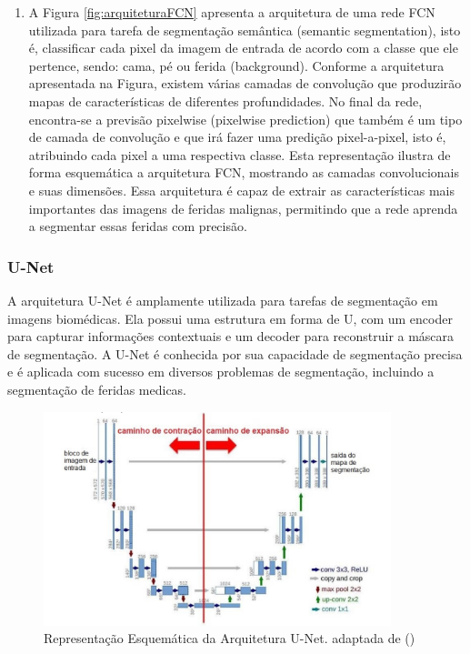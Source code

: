         \begin{enumerate}
            \item A Figura \ref{fig:arquiteturaFCN} apresenta a arquitetura de uma rede \ac{FCN} utilizada para tarefa de segmentação semântica (semantic segmentation), isto é, classificar cada pixel da imagem de entrada de acordo com a classe que ele pertence, sendo: cama, pé ou ferida (background). Conforme a arquitetura apresentada na Figura, existem várias camadas de convolução que produzirão mapas de características de diferentes profundidades. No final da rede, encontra-se a previsão pixelwise (pixelwise prediction) que também é um tipo de camada de convolução e que irá fazer uma predição pixel-a-pixel, isto é, atribuindo cada pixel a uma respectiva classe. Esta representação ilustra de forma esquemática a arquitetura \ac{FCN}, mostrando as camadas convolucionais e suas dimensões. Essa arquitetura é capaz de extrair as características mais importantes das imagens de feridas malignas, permitindo que a rede aprenda a segmentar essas feridas com precisão. 
        \end{enumerate}

    
    \subsubsection{U-Net}

        A arquitetura \ac{U-Net} é amplamente utilizada para tarefas de segmentação em imagens biomédicas. Ela possui uma estrutura em forma de U, com um encoder para capturar informações contextuais e um decoder para reconstruir a máscara de segmentação. A \ac{U-Net} é conhecida por sua capacidade de segmentação precisa e é aplicada com sucesso em diversos problemas de segmentação, incluindo a segmentação de feridas medicas.

        \begin{figure}[H]
            \centering
            \includegraphics[width=0.9\textwidth]{img/arquitetura_U-Net.png}
            \caption{Representação Esquemática da Arquitetura \ac{U-Net}. adaptada de (\cite{ronneberger2015u})}
            \label{fig:arquiteturaUNet}
        \end{figure}

